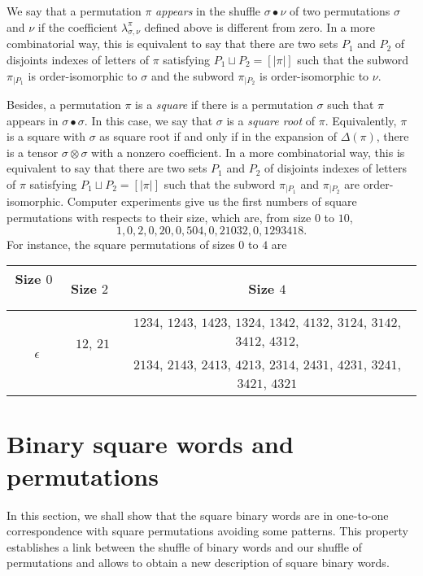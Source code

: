 \documentclass[a4paper]{llncs}
\DeclareMathOperator{\SHUFFLE}{\bullet}
\begin{document}
We say that a permutation $\pi$ {\em appears} in the shuffle
$\sigma \SHUFFLE \nu$ of two permutations $\sigma$ and $\nu$ if the
coefficient $\lambda_{\sigma, \nu}^\pi$ defined above is different from
zero. In a more combinatorial way, this is equivalent to say that there
are two sets $P_1$ and $P_2$ of disjoints indexes of letters of $\pi$
satisfying $P_1 \sqcup P_2 = [|\pi|]$ such that the subword $\pi_{|P_1}$
is order-isomorphic to $\sigma$ and the subword $\pi_{|P_2}$ is
order-isomorphic to $\nu$.
\medskip

Besides, a permutation $\pi$ is a {\em square} if there is a
permutation $\sigma$ such that $\pi$ appears in $\sigma \SHUFFLE \sigma$.
In this case, we say that $\sigma$ is a {\em square root} of $\pi$.
Equivalently, $\pi$ is a square with $\sigma$ as square root if and only
if in the expansion of $\Delta(\pi)$, there is a tensor
$\sigma \otimes \sigma$ with a nonzero coefficient. In a more
combinatorial way, this is equivalent to say that there are two sets
$P_1$ and $P_2$ of disjoints indexes of letters of $\pi$ satisfying
$P_1 \sqcup P_2 = [|\pi|]$ such that the subword $\pi_{|P_1}$ and
$\pi_{|P_2}$ are order-isomorphic. Computer experiments give us the
first numbers of square permutations with respects to their size, which
are, from size $0$ to $10$,
\begin{equation}
    1, 0, 2, 0, 20, 0, 504, 0, 21032, 0, 1293418.
\end{equation}
For instance, the square permutations of sizes $0$ to $4$ are
\smallskip

\begin{tabular}{c|c|c}
    Size $0$ \, & Size $2$ & Size $4$ \\ \hline
    \multirow{2}{*}{\, $\epsilon$} &
    \multirow{2}{*}{\, $12$, $21$ \,} &
    $1234$, $1243$, $1423$, $1324$, $1342$, $4132$, $3124$, $3142$,
    $3412$, $4312$, \\
    & & $2134$, $2143$, $2413$, $4213$, $2314$, $2431$, $4231$, $3241$,
    $3421$, $4321$
\end{tabular}
\medskip


\section{Binary square words and permutations}
\label{section:Binary square words and permutations}
In this section, we shall show that the square binary words are in
one-to-one correspondence with square permutations avoiding some
patterns. This property establishes a link between the shuffle of binary
words and our shuffle of permutations and allows to obtain a new
description of square binary words.
\medskip
\end{document}
